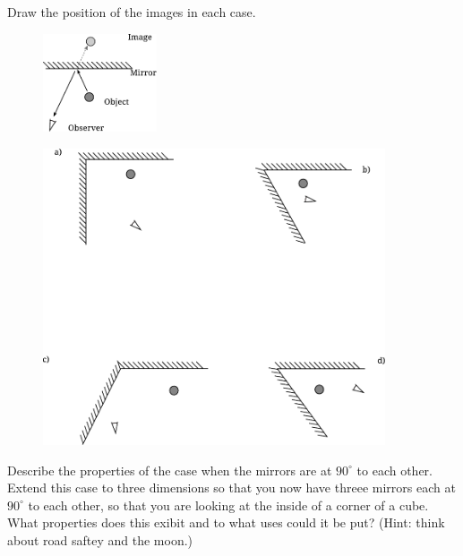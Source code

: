 Draw the position of the images in each case.
\begin{figure}[ht]
  \centering
  \includegraphics[width=0.3\textwidth]{mirrors_question_diag.pdf}
\end{figure}
\begin{figure}[ht]
  \centering
  \includegraphics[width=0.9\textwidth]{mirrors_question.pdf}
\end{figure}

Describe the properties of the case when the mirrors are at $90^{\circ}$ to each other. Extend this case to three dimensions so that you now have threee mirrors each at $90^{\circ}$ to each other, so that you are looking at the inside of a corner of a cube. What properties does this exibit and to what uses could it be put? (Hint: think about road saftey and the moon.)
